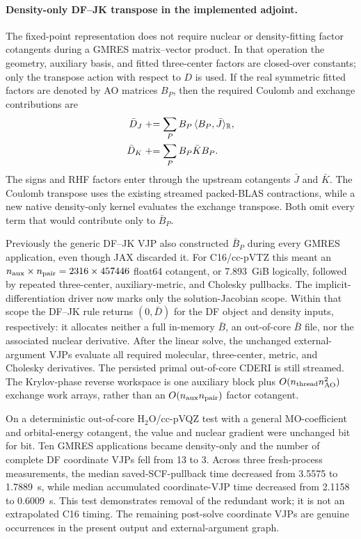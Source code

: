 \documentclass[11pt]{article}
\begin{document}
\paragraph{Density-only DF--JK transpose in the implemented adjoint.}
The fixed-point representation does not require nuclear or density-fitting
factor cotangents during a GMRES matrix--vector product.  In that operation
the geometry, auxiliary basis, and fitted three-center factors are closed-over
constants; only the transpose action with respect to $D$ is used.  If the
real symmetric fitted factors are denoted by AO matrices $B_P$, then the
required Coulomb and exchange contributions are
\begin{align}
 \bar D_J
 &\mathrel{+}=\sum_P B_P\,\langle B_P,\bar J\rangle_{\mathbb R},\notag\\
 \bar D_K
 &\mathrel{+}=\sum_P B_P\bar K B_P.
 \label{eq:dfjk-density-only-transpose}
\end{align}
The signs and RHF factors enter through the upstream cotangents $\bar J$ and
$\bar K$.  The Coulomb transpose uses the existing streamed packed-BLAS
contractions, while a new native density-only kernel evaluates the exchange
transpose.  Both omit every term that would contribute only to $\bar B_P$.

Previously the generic DF--JK VJP also constructed $\bar B_P$ during every
GMRES application, even though JAX discarded it.  For C16/cc-pVTZ this meant
an $n_{\rm aux}\times n_{\rm pair}=2316\times457446$ float64 cotangent,
or 7.893~GiB logically, followed by repeated three-center, auxiliary-metric,
and Cholesky pullbacks.  The implicit-differentiation driver now marks only
the solution-Jacobian scope.  Within that scope the DF--JK rule returns
$(0,\bar D)$ for the DF object and density inputs, respectively: it allocates
neither a full in-memory $\bar B$, an out-of-core $\bar B$ file, nor the
associated nuclear derivative.  After the linear solve, the unchanged
external-argument VJPs evaluate all required molecular, three-center,
metric, and Cholesky derivatives.
The persisted primal out-of-core CDERI is still streamed.  The Krylov-phase
reverse workspace is one auxiliary block plus
$O(n_{\rm thread}n_{\rm AO}^2)$ exchange work arrays, rather than an
$O(n_{\rm aux}n_{\rm pair})$ factor cotangent.

On a deterministic out-of-core H$_2$O/cc-pVQZ test with a general
MO-coefficient and orbital-energy cotangent, the value and nuclear gradient
were unchanged bit for bit.  Ten GMRES applications became density-only and
the number of complete DF coordinate VJPs fell from 13 to 3.  Across three
fresh-process measurements, the median saved-SCF-pullback time decreased
from 3.5575 to 1.7889~s, while median accumulated coordinate-VJP time
decreased from 2.1158 to 0.6009~s.  This test demonstrates removal of the
redundant work; it is not an extrapolated C16 timing.  The remaining
post-solve coordinate VJPs are genuine occurrences in the present output and
external-argument graph.
\end{document}
